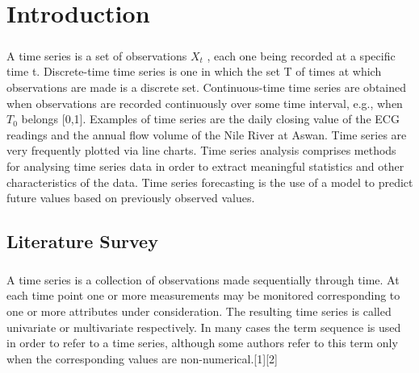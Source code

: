 \documentclass[12pt,a4paper]{report}
\begin{document}
\newpage

\setcounter{page}{1}

\pagestyle{fancy}
\chead{}
\rfoot{\small{\thepage}}
\renewcommand{\headrulewidth}{0.4pt}
\renewcommand{\footrulewidth}{0.4pt}

\chapter{Introduction}
\paragraph{} A time series is a set of observations $X_t$ , each one being recorded at a specific time t. Discrete-time time series is one in which the set T of times at which observations are made is a discrete set. Continuous-time time series are obtained when observations are recorded continuously over some time interval, e.g., when $T_0$ belongs [0,1]. Examples of time series are the daily closing value of the ECG readings and the annual flow volume of the Nile River at Aswan. Time series are very frequently plotted via line charts. Time series analysis comprises methods for analysing time series data in order to extract meaningful statistics and other characteristics of the data. Time series forecasting is the use of a model to predict future values based on previously observed values.  
\section{Literature Survey}
\paragraph{} A time series is a collection of observations made sequentially through time. At each time point one or more measurements may be monitored corresponding to one or more attributes under consideration. The resulting time series is called univariate or multivariate respectively. In many cases the term sequence is used in order to refer to a time series, although some authors refer to this term only when the corresponding values are non-numerical.[1][2]
\end{document}
